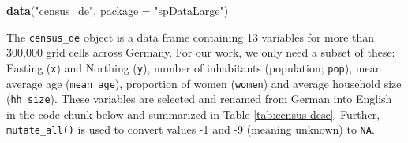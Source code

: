 \documentclass[]{krantz}
\newenvironment{Shaded}{\begin{snugshade}}{\end{snugshade}}
\newcommand{\CommentTok}[1]{\textcolor[rgb]{0.37,0.37,0.37}{\textit{#1}}}
\newcommand{\DataTypeTok}[1]{\textcolor[rgb]{0.27,0.27,0.27}{#1}}
\newcommand{\DecValTok}[1]{\textcolor[rgb]{0.06,0.06,0.06}{#1}}
\newcommand{\KeywordTok}[1]{\textcolor[rgb]{0.27,0.27,0.27}{\textbf{#1}}}
\newcommand{\NormalTok}[1]{#1}
\newcommand{\OperatorTok}[1]{\textcolor[rgb]{0.43,0.43,0.43}{\textbf{#1}}}
\newcommand{\OtherTok}[1]{\textcolor[rgb]{0.37,0.37,0.37}{#1}}
\newcommand{\StringTok}[1]{\textcolor[rgb]{0.5,0.5,0.5}{#1}}
\begin{document}
\begin{Shaded}
\begin{Highlighting}[]
\KeywordTok{data}\NormalTok{(}\StringTok{"census_de"}\NormalTok{, }\DataTypeTok{package =} \StringTok{"spDataLarge"}\NormalTok{)}
\end{Highlighting}
\end{Shaded}

The \texttt{census\_de} object is a data frame containing 13 variables for more than 300,000 grid cells across Germany.
For our work, we only need a subset of these: Easting (\texttt{x}) and Northing (\texttt{y}), number of inhabitants (population; \texttt{pop}), mean average age (\texttt{mean\_age}), proportion of women (\texttt{women}) and average household size (\texttt{hh\_size}).
These variables are selected and renamed from German into English in the code chunk below and summarized in Table \ref{tab:census-desc}.
Further, \texttt{mutate\_all()} is used to convert values -1 and -9 (meaning unknown) to \texttt{NA}.

\begin{Shaded}
\end{Shaded}
\end{document}
